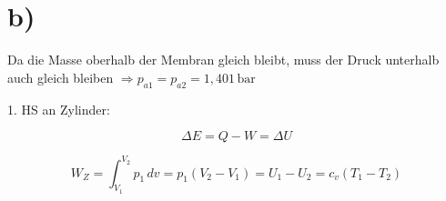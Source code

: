 

\section*{b)}

Da die Masse oberhalb der Membran gleich bleibt, muss der Druck unterhalb auch gleich bleiben $\Rightarrow p_{a1} = p_{a2} = 1,401 \, \text{bar}$

1. HS an Zylinder:

\[
\Delta E = Q - W = \Delta U
\]

\[
W_{Z} = \int_{V_1}^{V_2} p_1 \, dv = p_1 (V_2 - V_1) = U_1 - U_2 = c_v (T_1 - T_2)
\]